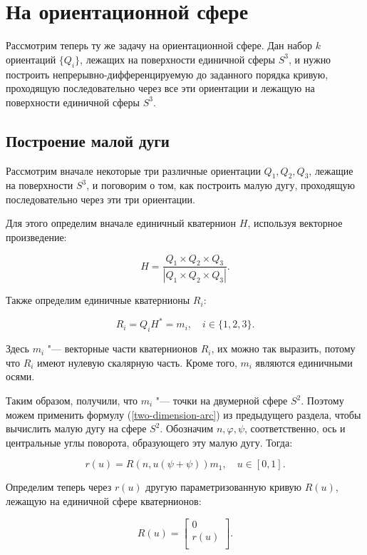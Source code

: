 \section{На ориентационной сфере}

Рассмотрим теперь ту же задачу на ориентационной сфере. Дан набор $k$ ориентаций $\{Q_i\}$, лежащих на поверхности
единичной сферы $S^3$, и нужно построить непрерывно-дифференцируемую до заданного порядка кривую, проходящую
последовательно через все эти ориентации и лежащую на поверхности единичной сферы $S^3$.

\subsection*{Построение малой дуги}

Рассмотрим вначале некоторые три различные ориентации $Q_1, Q_2, Q_3$, лежащие на поверхности $S^3$, и поговорим о
том, как построить малую дугу, проходящую последовательно через эти три ориентации.

Для этого определим вначале единичный кватернион $H$, используя векторное произведение:

\begin{equation}
H=\frac{Q_1 \times Q_2 \times Q_3}{|Q_1 \times Q_2 \times Q_3|}.
\label{orientation-axis}
\end{equation}

Также определим единичные кватернионы $R_i$:

$$
R_i=Q_iH^*=m_i, \quad i \in \{1,2,3\}.
$$

Здесь $m_i$ "--- векторные части кватернионов $R_i$, их можно так выразить, потому что $R_i$ имеют нулевую скалярную
часть. Кроме того, $m_i$ являются единичными осями.

Таким образом, получили, что $m_i$ "--- точки на двумерной сфере $S^2$. Поэтому можем применить формулу
(\ref{two-dimension-arc}) из предыдущего раздела, чтобы вычислить малую дугу на сфере $S^2$. Обозначим $n, \varphi, \psi$,
соответственно, ось и центральные углы поворота, образующего эту малую дугу. Тогда:

$$
r(u)=R(n,u(\psi+\psi))m_1, \quad u \in [0,1].
$$

Определим теперь через $r(u)$ другую параметризованную кривую $R(u)$, лежащую на единичной сфере кватернионов:

\begin{equation*}
R(u)=
\left[ {\begin{array}{c}
  0 \\
  r(u) \\
\end{array} } \right].
\end{equation*}

